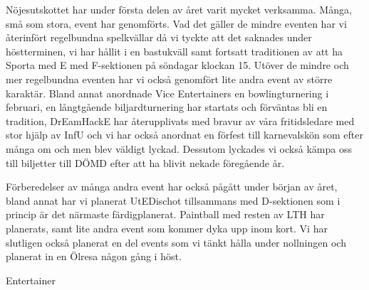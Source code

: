 \documentclass[../_main/handlingar.tex]{subfiles}
\begin{document}
Nöjesutskottet har under första delen av året varit mycket verksamma. Många, små som stora, event har genomförts. Vad det gäller de mindre eventen har vi återinfört regelbundna spelkvällar då vi tyckte att det saknades under höstterminen, vi har hållit i en bastukväll samt fortsatt traditionen av att ha Sporta med E med F-sektionen på söndagar klockan 15. Utöver de mindre och mer regelbundna eventen har vi också genomfört lite andra event av större karaktär. Bland annat anordnade Vice Entertainers en bowlingturnering i februari, en långtgående biljardturnering har startats och förväntas bli en tradition, DrEamHackE har återupplivats med bravur av våra fritidsledare med stor hjälp av InfU och vi har också anordnat en förfest till karnevalskön som efter många om och men blev väldigt lyckad. Dessutom lyckades vi också kämpa oss till biljetter till DÖMD efter att ha blivit nekade föregående år.

Förberedelser av många andra event har också pågått under början av året, bland annat har vi planerat UtEDischot tillsammans med D-sektionen som i princip är det närmaste färdigplanerat. Paintball med resten av LTH har planerats, samt lite andra event som kommer dyka upp inom kort. Vi har slutligen också planerat en del events som vi tänkt hålla under nollningen och planerat in en Ölresa någon gång i höst.
\begin{signatures}{1}
    \mvh
    \signature{Adam Belfrage}{Entertainer}
\end{signatures}
\end{document}
